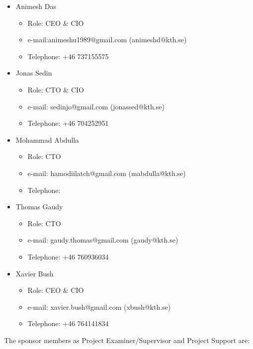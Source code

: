 \documentclass[11pt]{article}
\begin{document}
\begin{itemize}

\item Animesh Das
	\begin{itemize}
	\item Role: CEO \& CIO
	\item e-mail:animeshu1989@gmail.com (animeshd@kth.se)
	\item Telephone: +46 737155575
	\end{itemize}
	
\item Jonas Sedin
	\begin{itemize}
	\item Role: CTO \& CIO
	\item e-mail: sedinjo@gmail.com (jonassed@kth.se)
	\item Telephone: +46 704252951
	\end{itemize}
	
\item Mohammad Abdulla
	\begin{itemize}
	\item Role: CTO
	\item e-mail: hamodiilatch@gmail.com (mabdulla@kth.se)
	\item Telephone: 
	\end{itemize}
	
\item Thomas Gaudy
	\begin{itemize}
	\item Role: CTO
	\item e-mail: gaudy.thomas@gmail.com (gaudy@kth.se)
	\item Telephone: +46 760936034
	\end{itemize}
	
\item Xavier Bush
	\begin{itemize}
	\item Role: CEO \& CIO
	\item e-mail: xavier.bush@gmail.com (xbush@kth.se)
	\item Telephone: +46 764141834
	\end{itemize}
	
	
\end{itemize}

The sponsor members as Project Examiner/Supervisor and Project Support are:
\end{document}
